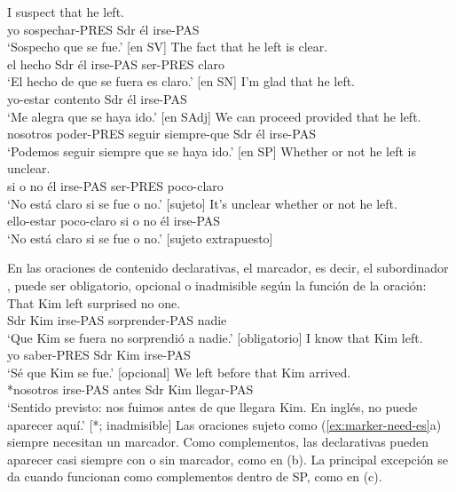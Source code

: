 \ea \label{ex:content-funcs-es}
    \ea \gll I suspect {\ob}that he left{\cb}.\\
        yo sospechar-PRES Sdr él irse-PAS\\
    \glt `Sospecho que se fue.' [en SV]
    \ex \gll The fact {\ob}that he left{\cb} is clear.\\
        el hecho Sdr él irse-PAS ser-PRES claro\\
    \glt `El hecho de que se fuera es claro.' [en SN]
    \ex \gll I'm glad {\ob}that he left{\cb}.\\
        yo-estar contento Sdr él irse-PAS\\
    \glt `Me alegra que se haya ido.' [en SAdj]
    \ex \gll We can proceed provided {\ob}that he left{\cb}.\\
        nosotros poder-PRES seguir siempre-que Sdr él irse-PAS\\
    \glt `Podemos seguir siempre que se haya ido.' [en SP]
    \ex \gll Whether or not he left is unclear.\\
        si o no él irse-PAS ser-PRES poco-claro\\
    \glt `No está claro si se fue o no.' [sujeto]
    \ex \gll It's unclear whether or not he left.\\
        ello-estar poco-claro si o no él irse-PAS\\
    \glt `No está claro si se fue o no.' [sujeto extrapuesto]
    \z
\z

En las oraciones de contenido declarativas, el marcador, es decir, el subordinador , puede ser obligatorio, opcional o inadmisible según la función de la oración:
\ea\label{ex:marker-need-es}
    \ea \gll That Kim left surprised no one.\\
        Sdr Kim irse-PAS sorprender-PAS nadie\\
    \glt `Que Kim se fuera no sorprendió a nadie.' [obligatorio]
    \ex \gll I know that Kim left.\\
        yo saber-PRES Sdr Kim irse-PAS\\
    \glt `Sé que Kim se fue.' [opcional]
    \ex \gll *We left before that Kim arrived.\\
        *nosotros irse-PAS antes Sdr Kim llegar-PAS\\
    \glt `Sentido previsto: nos fuimos antes de que llegara Kim. En inglés,  no puede aparecer aquí.' [*; inadmisible]
\z
\z
Las oraciones sujeto como (\ref{ex:marker-need-es}a) siempre necesitan un marcador. Como complementos, las declarativas pueden aparecer casi siempre con o sin marcador, como en (b). La principal excepción se da cuando funcionan como complementos dentro de SP, como en (c).

